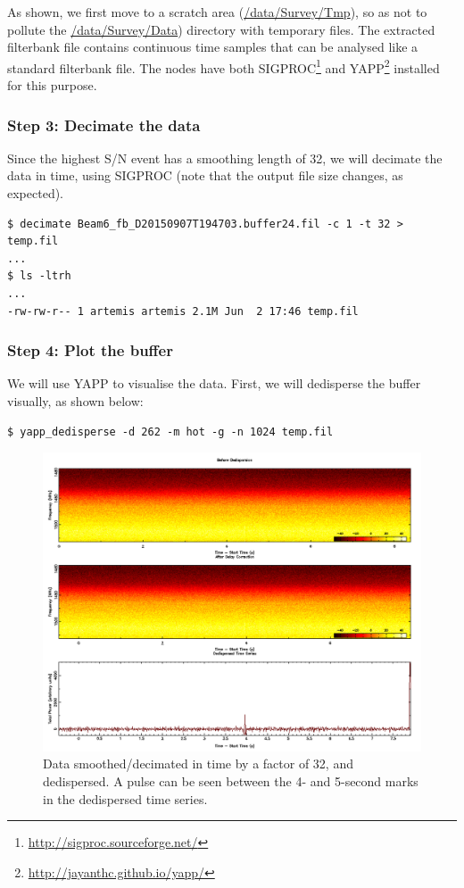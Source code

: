 \documentclass{article}
\begin{document}
As shown, we first move to a scratch area (\url{/data/Survey/Tmp}), so as not
to pollute the \url{/data/Survey/Data}) directory with temporary files. The
extracted filterbank file contains continuous time samples that can be analysed
like a standard filterbank file. The nodes have both
SIGPROC\footnote{\url{http://sigproc.sourceforge.net/}} and
YAPP\footnote{\url{http://jayanthc.github.io/yapp/}} installed for this purpose.

\subsubsection*{Step 3: Decimate the data}

Since the highest S/N event has a smoothing length of 32, we will decimate the
data in time, using SIGPROC (note that the output file size changes, as
expected).

\small{
\begin{verbatim}
$ decimate Beam6_fb_D20150907T194703.buffer24.fil -c 1 -t 32 > temp.fil
...
$ ls -ltrh
...
-rw-rw-r-- 1 artemis artemis 2.1M Jun  2 17:46 temp.fil
\end{verbatim}
}


\subsubsection*{Step 4: Plot the buffer}

We will use YAPP to visualise the data. First, we will dedisperse the buffer
visually, as shown below:

\small{
\begin{verbatim}
$ yapp_dedisperse -d 262 -m hot -g -n 1024 temp.fil
\end{verbatim}
}

\begin{figure}[h]
\includegraphics[width=\textwidth]{dd_tsnofs.png}
\caption{Data smoothed/decimated in time by a factor of 32, and dedispersed.
    A pulse can be seen between the 4- and 5-second marks in the dedispersed
    time series.
    \label{fig_dd_tsnofs}}
\end{figure}
\end{document}
